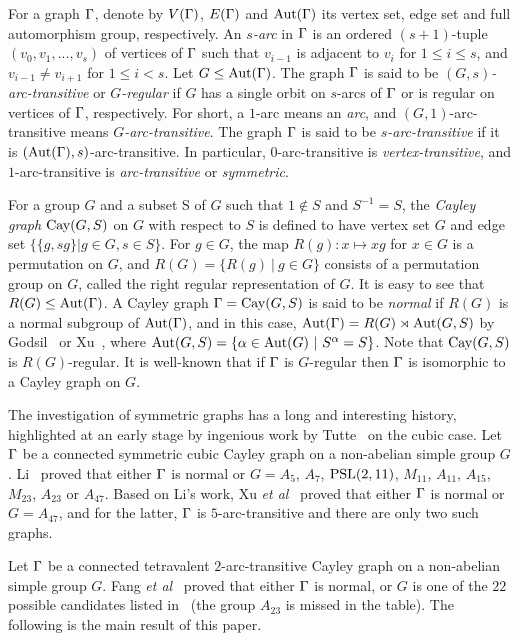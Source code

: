 \documentclass[12pt]{article}
\def\PSL{\hbox{\rm PSL}}\def\PSU{\hbox{\rm PSU}}
\def\Aut{\hbox{\rm Aut}}
\def\Cay{\hbox{\rm Cay}}
\begin{document}
For a graph $\Gamma$, denote by $V(\Gamma)$, $E(\Gamma)$ and $\Aut(\G)$ its vertex set, edge set and full automorphism group, respectively. An {\it $s$-arc} in $\Gamma$ is an ordered $(s+1)$-tuple $(v_0,v_1,...,v_s)$ of vertices of $\Gamma$ such that $v_{i-1}$ is adjacent to $v_i$ for $1\leq i\leq s$, and $v_{i-1}\neq v_{i+1}$ for $1\leq i<s$.  Let $G\leq \Aut(\Gamma)$. The graph $\Gamma$ is said to be {\it $(G,s)$-arc-transitive} or  {\it $G$-regular} if $G$ has a single orbit on $s$-arcs of $\Gamma$ or is regular on vertices of $\Gamma$, respectively. For short, a $1$-arc means an {\it arc}, and  $(G,1)$-arc-transitive means {\it $G$-arc-transitive}. The graph $\Gamma$ is said to be {\it $s$-arc-transitive} if it is $(\Aut(\G), s)$-arc-transitive. In particular, $0$-arc-transitive is {\it vertex-transitive}, and $1$-arc-transitive is {\it arc-transitive} or {\it symmetric}.

For a group $G$ and a subset S of $G$ such that $1\notin S$ and $S^{-1}=S$, the \emph{Cayley graph} $\Cay(G,S)$ on $G$ with respect to $S$ is defined to have vertex set $G$ and edge set $\{\{g, sg\} | g \in G, s \in S\}$. For $g\in G$, the map $R(g): x\mapsto xg$ for $x\in G$ is a permutation on $G$, and $R(G)=\{R(g)\ |\ g\in G\}$ consists of a permutation group on $G$, called the right regular representation of $G$. It is easy to see that $R(G)\leq \Aut(\G)$. A Cayley graph $\G=\Cay(G,S)$ is said to be \emph{normal} if $R(G)$ is a normal subgroup of $\Aut(\G)$, and in this case, $\Aut(\G)=R(G)\rtimes \Aut(G,S)$ by Godsil~\cite{Godsil} or Xu~\cite{Xu}, where $\Aut(G,S)=\{\alpha \in \Aut(G)\ |\ S^{\alpha}=S\}$. Note that $\Cay(G,S)$ is $R(G)$-regular. It is well-known that if $\Gamma$ is $G$-regular then $\Gamma$ is isomorphic to a Cayley graph on $G$.

The investigation of symmetric graphs has a long and interesting history, highlighted at an early stage by ingenious work by Tutte~\cite{Tutte1,Tutte2} on the cubic case. Let $\Gamma$ be a connected symmetric cubic Cayley graph on a non-abelian simple group $G$. Li~\cite{CHLi} proved that either $\Gamma$ is normal or $G=A_5$, $A_7$, $\PSL(2,11)$, $M_{11}$, $A_{11}$, $A_{15}$, $M_{23}$, $A_{23}$ or $A_{47}$. Based on Li's work, Xu {\em et al}~\cite{XFWX2005,XFWX} proved that either $\Gamma$ is normal or $G= A_{47}$, and for the latter, $\Gamma$ is $5$-arc-transitive and there are only two such graphs.

Let $\Gamma$ be a connected tetravalent $2$-arc-transitive Cayley graph on a non-abelian simple group $G$. Fang {\em et al}~\cite{Fang4} proved that either $\Gamma$ is normal, or $G$ is one of the $22$ possible candidates listed in~\cite[Table~1]{Fang4} (the group $A_{23}$ is missed in the table). The following is the main result of this paper.
\end{document}
